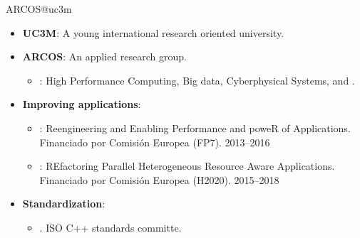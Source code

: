 \begin{frame}{ARCOS@uc3m}
\begin{itemize}
  \item \textbf{UC3M}: A young international research oriented university.
  \vfill
  \item \textbf{ARCOS}: An applied research group.
    \begin{itemize}
      \item {\color{blue}{Lines}}: 
        High Performance Computing,
        Big data,
        Cyberphysical Systems, and
        .
    \end{itemize} 
  \vfill
  \item \textbf{Improving applications}:
    \begin{itemize}
      \item {}: Reengineering and Enabling Performance and poweR of Applications.
            Financiado por Comisión Europea (FP7). 2013--2016
      \item {}: REfactoring Parallel Heterogeneous Resource Aware Applications.
            Financiado por Comisión Europea (H2020). 2015--2018
    \end{itemize} 
  \vfill
  \item \textbf{Standardization}:
    \begin{itemize}
      \item {}. ISO C++ standards committe.
    \end{itemize}
\end{itemize}
\end{frame}
